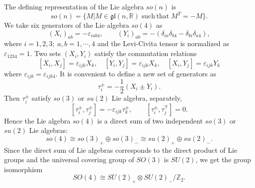 \documentclass[12pt,epsf]{article}
\begin{document}
The defining representation of the Lie algebra $so(n)$ is
$$ so(n) = \{ M| M \in \mathfrak{gl}(n, \mathbb{R}) \; \mathrm{such \, that} \; M^T = -M \}.$$
We take six generators of the Lie algebra $so(4)$ as
\begin{equation}\label{ab-so4}
  (X_i)_{ab} = - \varepsilon_{iab4}, \qquad (Y_i)_{ab} = - (\delta_{ai} \delta_{b4} - \delta_{bi} \delta_{a4} ),
\end{equation}
where $i=1,2,3; \; a,b = 1, \cdots, 4$ and the Levi-Civita tensor is normalized as $\varepsilon_{1234} =1$.
Two sets $(X_i, Y_i)$ satisfy the commutation relations
$$[X_i, X_j] = \varepsilon_{ijk} X_k, \quad [Y_i, Y_j] = \varepsilon_{ijk} X_k, \quad [X_i, Y_j] = \varepsilon_{ijk} Y_k$$
where $\varepsilon_{ijk}= \varepsilon_{ijk4}$.
It is convenient to define a new set of generators as
\begin{equation}\label{t+-}
  \tau^\pm_i = - \frac{1}{2} (X_i \pm Y_i).
\end{equation}
Then $\tau_i^\pm$ satisfy $so(3)$ or $su(2)$ Lie algebra, separately,
\begin{equation}\label{t-lie}
  [\tau^\pm_i, \tau^\pm_j ]  = - \varepsilon_{ijk} \tau^\pm_k, \qquad [\tau^\pm_i, \tau^\mp_j ] = 0.
\end{equation}
Hence the Lie algebra $so(4)$ is a direct sum of two independent $so(3)$ or $su(2)$ Lie algebras:
\begin{equation}\label{4-lie-iso}
so(4) \cong so(3)_+ \oplus so(3)_- \cong su(2)_+ \oplus su(2)_-.
\end{equation}
Since the direct sum of Lie algebras corresponds to the direct product of Lie groups
and the universal covering group of $SO(3)$ is $SU(2)$, we get the group isomorphism \cite{book-wybo}
\begin{equation}\label{4-group-iso}
  SO(4) \cong SU(2)_+ \otimes SU(2)_-/\mathbb{Z}_2.
\end{equation}
\end{document}
